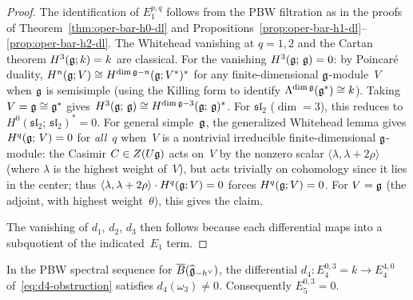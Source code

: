 \begin{proof}
The identification of $E_1^{p,q}$ follows from the PBW filtration
as in the proofs of Theorem~\ref{thm:oper-bar-h0-dl} and
Propositions~\ref{prop:oper-bar-h1-dl}--\ref{prop:oper-bar-h2-dl}.
The Whitehead vanishing at $q = 1, 2$ and the Cartan theorem
$H^3(\mathfrak{g}; k) = k$ are classical.  For the vanishing
$H^3(\mathfrak{g};\, \mathfrak{g}) = 0$: by Poincar\'e duality,
$H^n(\mathfrak{g}; V) \cong H^{\dim\mathfrak{g} - n}(\mathfrak{g}; V^*)^*$ for any
finite-dimensional $\mathfrak{g}$-module~$V$ when $\mathfrak{g}$ is semisimple
(using the Killing form to identify
$\Lambda^{\dim\mathfrak{g}}(\mathfrak{g}^*) \cong k$).  Taking $V = \mathfrak{g} \cong \mathfrak{g}^*$
gives $H^3(\mathfrak{g};\, \mathfrak{g}) \cong H^{\dim\mathfrak{g} - 3}(\mathfrak{g};\, \mathfrak{g})^*$.
For $\mathfrak{sl}_2$ ($\dim = 3$), this reduces to $H^0(\mathfrak{sl}_2;\, \mathfrak{sl}_2)^* = 0$.
For general simple~$\mathfrak{g}$, the generalized Whitehead lemma gives
$H^q(\mathfrak{g};\, V) = 0$ for \emph{all}~$q$ when~$V$ is a
nontrivial irreducible finite-dimensional $\mathfrak{g}$-module:
the Casimir $C \in Z(U\mathfrak{g})$ acts on~$V$ by the nonzero scalar
$\langle \lambda, \lambda + 2\rho\rangle$ (where $\lambda$ is the
highest weight of~$V$), but acts trivially on cohomology
since it lies in the center; thus
$\langle \lambda, \lambda + 2\rho\rangle \cdot H^q(\mathfrak{g}; V)
= 0$ forces $H^q(\mathfrak{g}; V) = 0$.  For $V = \mathfrak{g}$ (the adjoint,
with highest weight~$\theta$), this gives the claim.

The vanishing of $d_1$, $d_2$, $d_3$ then follows because each
differential maps into a subquotient of the indicated~$E_1$ term.
\end{proof}

\begin{proposition}
\label{prop:d4-nonvanishing}
In the PBW spectral sequence for $\overline{B}(\widehat{\mathfrak{g}}_{-h^\vee})$,
the differential
$d_4\colon E_4^{0,3} = k \to E_4^{4,0}$
of~\eqref{eq:d4-obstruction} satisfies $d_4(\omega_3) \neq 0$.
Consequently $E_5^{0,3} = 0$.
\end{proposition}

